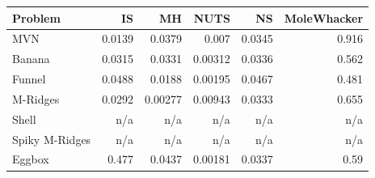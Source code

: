 \begin{tabular}{lrrrrr}
\toprule
Problem & IS & MH & NUTS & NS & MoleWhacker \\
\midrule
MVN & 0.0139 & 0.0379 & 0.007 & 0.0345 & 0.916 \\
Banana & 0.0315 & 0.0331 & 0.00312 & 0.0336 & 0.562 \\
Funnel & 0.0488 & 0.0188 & 0.00195 & 0.0467 & 0.481 \\
M-Ridges & 0.0292 & 0.00277 & 0.00943 & 0.0333 & 0.655 \\
Shell & n/a & n/a & n/a & n/a & n/a \\
Spiky M-Ridges & n/a & n/a & n/a & n/a & n/a \\
\midrule
Eggbox & 0.477 & 0.0437 & 0.00181 & 0.0337 & 0.59 \\
\bottomrule
\end{tabular}
